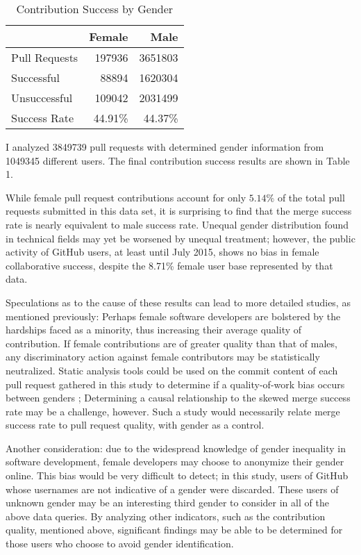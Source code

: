 \documentclass{sigplanconf}
\begin{document}
\begin{table}[h]
  \begin{center}
    \caption{Contribution Success by Gender}
    \begin{tabular}{l|r|r}
      & Female & Male\\ \hline
      Pull Requests & \num{197936} & \num{3651803} \\ \hline
      Successful  & \num{88894} & \num{1620304} \\ \hline
      Unsuccessful  & \num{109042} & \num{2031499} \\ \hline
      Success Rate & \num{44.91}\% & \num{44.37}\% \\ \hline
    \end{tabular}
  \end{center}
\end{table}

I analyzed \num{3849739} pull requests with determined gender information from
\num{1049345} different users. The final contribution success results are shown in Table 1.

While female pull request contributions account for only $5.14\%$ of the total pull
requests submitted in this data set, it is surprising to find that the merge
success rate is nearly equivalent to male success rate. Unequal gender
distribution found in technical fields may yet be worsened by unequal treatment;
however, the public activity of GitHub users, at least until July 2015,
shows no bias in female collaborative success, despite the 8.71\% female
user base represented by that data.

Speculations as to the cause of these results can lead to more detailed studies,
as mentioned previously:
Perhaps female software developers are bolstered by the hardships faced as a
minority, thus increasing their average quality of contribution. If female
contributions are of greater quality than that of males, any discriminatory
action against female contributors may be statistically neutralized. Static
analysis tools could be used on the commit content of each pull request gathered
in this study to determine if a quality-of-work bias occurs between genders
\cite{staticanalysis}; Determining a causal relationship to the skewed merge success rate may be a
challenge, however. Such a study would necessarily relate merge success rate to
pull request quality, with gender as a control.

Another consideration: due to the widespread knowledge of gender inequality in software development,
female developers may choose to anonymize their gender online. This bias would
be very difficult to detect; in this study, users of GitHub whose usernames are
not indicative of a gender were discarded. These users of unknown gender may be
an interesting third gender to consider in all of the above data queries. By
analyzing other indicators, such as the contribution quality, mentioned above,
significant findings may be able to be determined for those users who choose to
avoid gender identification.
\end{document}
